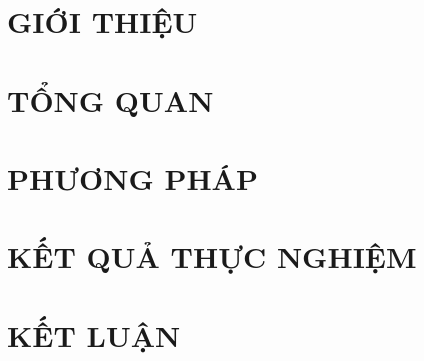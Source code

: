 \documentclass[a4paper,13pt,3p,twoside]{report}
\theoremstyle{definition}
\begin{document}
\glsaddall 
\renewcommand*{\acronymname}{DANH SÁCH THUẬT NGỮ}
\renewcommand*{\entryname}{Từ viết tắt}
\renewcommand*{\descriptionname}{Định nghĩa}
\printnoidxglossaries

\renewcommand\appendixname{APPENDIX}
\renewcommand\appendixpagename{APPENDIX}
\renewcommand\appendixtocname{APPENDIX}

\renewcommand{\figurename}{Hình}
\renewcommand{\tablename}{Bảng}
\renewcommand{\chaptername}{CHƯƠNG}



\newpage
{}

\pagestyle{fancy}
\fancyhf{}
\fancyhead[RE, LO]{\leftmark}
\fancyfoot[RE, LO]{\thepage}

\chapter{GIỚI THIỆU}

\newpage
\chapter{TỔNG QUAN}



\newpage
\chapter{PHƯƠNG PHÁP}


\newpage
\chapter{KẾT QUẢ THỰC NGHIỆM}


\newpage
\chapter{KẾT LUẬN}




\newpage
\renewcommand\bibname{REFERENCE}
\printbibliography
{}
\end{document}
